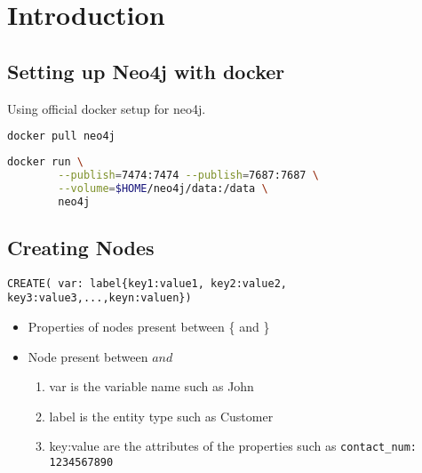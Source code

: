 \documentclass[../main.tex]{subfiles}
\begin{document}
% 
% 
% 

\chapter{Introduction}
\section{Setting up Neo4j with docker}
Using official docker setup \href{https://hub.docker.com/_/neo4j}{\color{blue}{link}} for neo4j.
\begin{lstlisting}[language=bash, caption={get neo4j image}]
docker pull neo4j
\end{lstlisting}
\begin{lstlisting}[language=bash, caption={Starting neo4j container}]
docker run \
		--publish=7474:7474 --publish=7687:7687 \
		--volume=$HOME/neo4j/data:/data \
		neo4j
\end{lstlisting}

\section{Creating Nodes}
\begin{lstlisting}[language=cypher, caption={Create Node}]
CREATE( var: label{key1:value1, key2:value2, key3:value3,...,keyn:valuen})
\end{lstlisting}
\begin{itemize}
	\item{Properties of nodes present between \{ and \}}
	\item{ 
			Node present between \( and \)
			\begin{enumerate}
				\item{var is the variable name such as John}
				\item{label is the entity type such as Customer}
				\item{key:value are the attributes of the properties such as  \lstinline{contact_num: 1234567890}}
			\end{enumerate}
		}
\end{itemize}


\printglossaries
\end{document}
